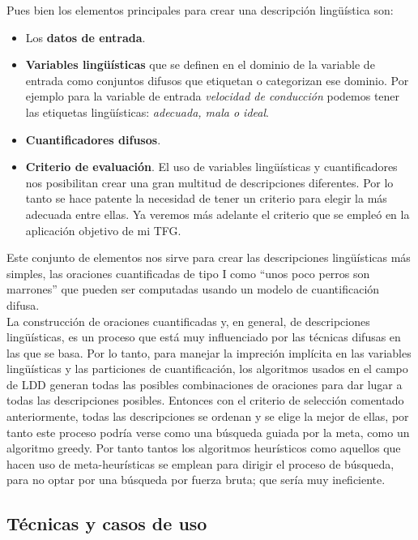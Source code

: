 \documentclass[10pt,a4paper]{article}
\begin{document}
Pues bien los elementos principales para crear una descripción lingüística son:

\begin{itemize}
\item Los \textbf{datos de entrada}.
\item \textbf{Variables lingüísticas} que se definen en el dominio de la variable de entrada como conjuntos difusos que etiquetan o categorizan ese dominio. Por ejemplo para la variable de entrada \textit{velocidad de conducción} podemos tener las etiquetas lingüísticas: \textit{adecuada, mala o ideal}.
\item \textbf{Cuantificadores difusos}.
\item \textbf{Criterio de evaluación}. El uso de variables lingüísticas y cuantificadores nos posibilitan crear una gran multitud de descripciones diferentes. Por lo tanto se hace patente la necesidad de tener un criterio para elegir la más adecuada entre ellas. Ya veremos más adelante el criterio que se empleó en la aplicación objetivo de mi TFG.
\end{itemize}

Este conjunto de elementos nos sirve para crear las descripciones lingüísticas más simples, las oraciones cuantificadas de tipo I como ``unos poco perros son marrones'' que pueden ser computadas usando un modelo de cuantificación difusa.\\

La construcción de oraciones cuantificadas y, en general, de descripciones lingüísticas, es un proceso que está muy influenciado por las técnicas difusas en las que se basa. Por lo tanto, para manejar la impreción implícita en las variables lingüísticas y las particiones de cuantificación, los algoritmos usados en el campo de LDD generan todas las posibles combinaciones de oraciones para dar lugar a todas las descripciones posibles. Entonces con el criterio de selección comentado anteriormente, todas las descripciones se ordenan y se elige la mejor de ellas, por tanto este proceso podría verse como una búsqueda guiada por la meta, como un algoritmo greedy. Por tanto tantos los algoritmos heurísticos como aquellos que hacen uso de meta-heurísticas se emplean para dirigir el proceso de búsqueda, para no optar por una búsqueda por fuerza bruta; que sería muy ineficiente.\\

\subsection{Técnicas y casos de uso}
\end{document}
